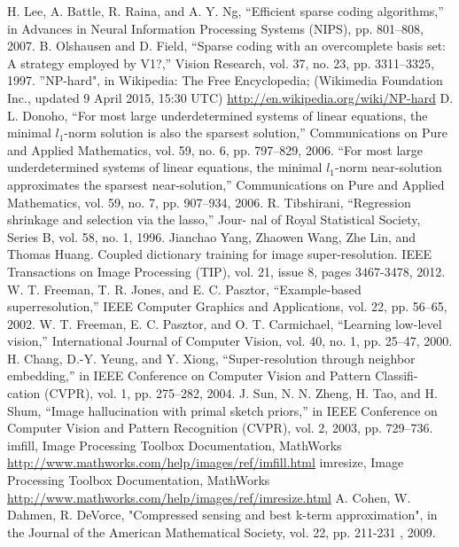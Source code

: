 \begin{thebibliography}{99}
 H. Lee, A. Battle, R. Raina, and A. Y. Ng, “Efficient sparse coding algorithms,” in Advances in Neural Information Processing Systems (NIPS), pp. 801–808, 2007.
 B. Olshausen and D. Field, “Sparse coding with an overcomplete basis set: A strategy employed by V1?,” Vision Research, vol. 37, no. 23, pp. 3311–3325, 1997.
 ”NP-hard", in Wikipedia: The Free Encyclopedia; (Wikimedia Foundation Inc., updated 9 April 2015, 15:30 UTC) \url{http://en.wikipedia.org/wiki/NP-hard}
 D. L. Donoho, “For most large underdetermined systems of linear equations, the minimal $l_1$-norm solution is also the sparsest solution,” Communications on Pure and Applied Mathematics, vol. 59, no. 6, pp. 797–829, 2006.
 “For most large underdetermined systems of linear equations, the minimal $l_1$-norm near-solution approximates the sparsest near-solution,” Communications on Pure and Applied Mathematics, vol. 59, no. 7, pp. 907–934, 2006.
 R. Tibshirani, “Regression shrinkage and selection via the lasso,” Jour- nal of Royal Statistical Society, Series B, vol. 58, no. 1, 1996.
 Jianchao Yang, Zhaowen Wang, Zhe Lin, and Thomas Huang. Coupled dictionary training for image super-resolution. IEEE Transactions on Image Processing (TIP), vol. 21, issue 8, pages 3467-3478, 2012.
 W. T. Freeman, T. R. Jones, and E. C. Pasztor, “Example-based superresolution,” IEEE Computer Graphics and Applications, vol. 22, pp. 56–65, 2002.
 W. T. Freeman, E. C. Pasztor, and O. T. Carmichael, “Learning low-level vision,” International Journal of Computer Vision, vol. 40, no. 1, pp. 25–47, 2000.
 H. Chang, D.-Y. Yeung, and Y. Xiong, “Super-resolution through neighbor embedding,” in IEEE Conference on Computer Vision and Pattern Classifi- cation (CVPR), vol. 1, pp. 275–282, 2004.
 J. Sun, N. N. Zheng, H. Tao, and H. Shum, “Image hallucination with primal sketch priors,” in IEEE Conference on Computer Vision and Pattern Recognition (CVPR), vol. 2, 2003, pp. 729–736.
 imfill, Image Processing Toolbox Documentation, MathWorks \\ \url{http://www.mathworks.com/help/images/ref/imfill.html}
 imresize, Image Processing Toolbox Documentation, MathWorks \\ \url{http://www.mathworks.com/help/images/ref/imresize.html}
 A. Cohen, W. Dahmen, R. DeVorce, "Compressed sensing and best k-term approximation", in the Journal of the American Mathematical Society, vol. 22, pp. 211-231 , 2009.




\end{thebibliography}